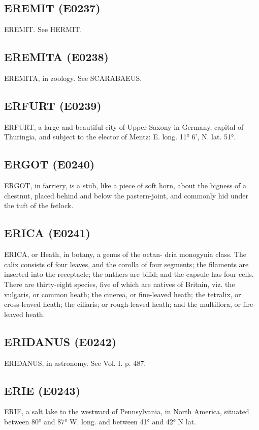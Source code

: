 \documentclass{article}
\begin{document}
\subsection*{EREMIT (E0237)}
EREMIT. See HERMIT.

\subsection*{EREMITA (E0238)}
EREMITA, in zoology. See SCARABAEUS.

\subsection*{ERFURT (E0239)}
ERFURT, a large and beautiful city of Upper Saxony in Germany, capital of Thuringia, and subject to the elector of Mentz: E. long. 11° 6', N. lat. 51°.

\subsection*{ERGOT (E0240)}
ERGOT, in farriery, is a stub, like a piece of soft horn, about the bigness of a chestnut, placed behind and below the pastern-joint, and commonly hid under the tuft of the fetlock.

\subsection*{ERICA (E0241)}
ERICA, or Heath, in botany, a genus of the octan-
dria monogynia class. The calix consists of four
leaves, and the corolla of four segments; the filaments
are inserted into the receptacle; the anthers are bifid;
and the capsule has four cells. There are thirty-eight
species, five of which are natives of Britain, viz. the
vulgaris, or common heath; the cinerea, or fine-leaved
heath; the tetralix, or cross-leaved heath; the ciliaris;
or rough-leaved heath; and the multiflora, or fire-
leaved heath.

\subsection*{ERIDANUS (E0242)}
ERIDANUS, in astronomy. See Vol. I. p. 487.

\subsection*{ERIE (E0243)}
ERIE, a salt lake to the westward of Pennsylvania, in North America, situated between 80° and 87° W. long. and between 41° and 42° N lat.
\end{document}
